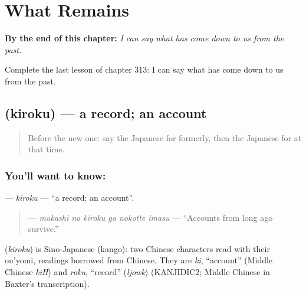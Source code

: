 
\chapter{What Remains}
\label{ch:ja-what-remains}

\begin{chapteropening}
\textbf{By the end of this chapter:} \emph{I can say what has come down to us from the past.}

Complete the last lesson of chapter 313: I can say what has come down to us from the past.
\end{chapteropening}

\section[\texorpdfstring{\ja{きろく} (kiroku)}{きろく (kiroku)}]{ (kiroku) — a record; an account}

\label{lesson:JA-C313-kiroku}



\begin{quote}
Before the new one: say the Japanese for formerly, then the Japanese for at that time.
\end{quote}

\subsection*{You'll want to know: }
\textbf{} — \emph{kiroku} — \textquotedblleft{}a record; an account\textquotedblright{}.

\begin{quote}
\textbf{  } — \emph{mukashi no kiroku ga nokotte imasu} — \textquotedblleft{}Accounts from long ago survive.\textquotedblright{}
\end{quote}

\begin{cousinweb}
\textbf{} (\emph{kiroku}) is Sino-Japanese (kango): two Chinese characters read with their on'yomi, readings borrowed from Chinese. They are \emph{ki}, \textquotedblleft{}account\textquotedblright{} (Middle Chinese \emph{kiH}) and \emph{roku}, \textquotedblleft{}record\textquotedblright{} (\emph{ljowk}) (KANJIDIC2; Middle Chinese in Baxter's transcription).
\end{cousinweb}

